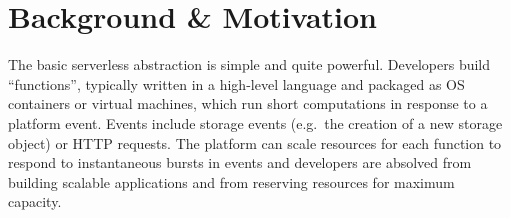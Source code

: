 \section{Background \& Motivation}\label{sec:bg}

\begin{table}[]
\centering
\scriptsize
{}
\caption{Comparison with existing approaches}
\label{table:positioning}
\end{table}



The basic serverless abstraction is simple and quite powerful. Developers build
``functions'', typically written in a high-level language and packaged as OS
containers or virtual machines, which run short computations in response to a
platform event. Events include storage events (e.g.\ the creation of a new
storage object) or HTTP requests. The platform can scale resources for each
function to respond to instantaneous bursts in events and developers are
absolved from building scalable applications and from reserving resources for
maximum capacity.

